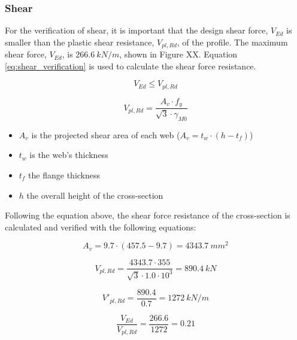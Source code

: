 
\subsubsection{Shear}

For the verification of shear, it is important that the design shear force, $V_{Ed}$ is smaller than the plastic shear resistance, $V_{pl,Rd}$, of the profile. The maximum shear force, $V_{Ed}$, is $266.6 \ kN/m$, shown in Figure XX. Equation \ref{eq:shear_verification} is used to calculate the shear force resistance.

\begin{equation}
    V_{Ed} \leq V_{pl,Rd}
    \label{eq:shear_plastic}
\end{equation}

\begin{equation}
    V_{pl,Rd} = \frac{A_v \cdot f_{y}}{\sqrt{3} \cdot \gamma_{M0}}
    \label{eq:shear_verification}
\end{equation}

\begin{itemize}
    \item $A_{v}$ is the projected shear area of each web ($A_{v} = t_w \cdot (h-t_f)$)
    \item $t_w$ is the web’s thickness
    \item $t_f$ the flange thickness
    \item $h$ the overall height of the cross-section
\end{itemize}

Following the equation above, the shear force resistance of the cross-section is calculated and verified with the following equations:

\begin{equation}
    A_v = 9.7 \cdot (457.5 - 9.7) = 4343.7 \ mm^2
\end{equation}

\begin{equation}
    V_{pl,Rd} = \frac{4343.7 \cdot 355}{\sqrt{3} \cdot 1.0 \cdot 10^3} = 890.4 \ kN 
\end{equation}

\begin{equation}
    V'_{pl,Rd} = \frac{890.4}{0.7} = 1272 \ kN/m 
\end{equation}

\begin{equation}
    \frac{V_{Ed}}{V_{pl,Rd}} = \frac{266.6}{1272} = 0.21 
\end{equation}

